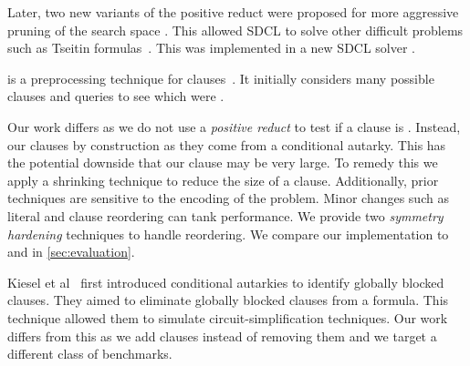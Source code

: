 Later, two new variants of the positive reduct were proposed for more aggressive pruning of the search space \cite{sadical}. This allowed SDCL to solve other difficult problems such as Tseitin formulas~\cite{hardexamplesresolution}. This was implemented in a new SDCL solver \sadical.


\prelearn is a preprocessing technique for \pr clauses~\cite{prelearn}. It initially considers many possible clauses and queries \sadical to see which were \pr.

Our work differs as we do not use a \emph{positive reduct} to test if a clause
is \pr. Instead, our clauses \pr by construction as they come from a conditional
autarky. This has the potential downside that our clause may be very large. To
remedy this we apply a shrinking technique to reduce the size of a clause.
Additionally, prior techniques are sensitive to the encoding of the problem.
Minor changes such as literal and clause reordering can tank performance. We
provide two \emph{symmetry hardening} techniques to handle reordering. We
compare our implementation \tool to \sadical and \prelearn in
\autoref{sec:evaluation}.

Kiesel et al~\cite{conditionalautarkies} first introduced conditional autarkies to identify globally blocked clauses. They aimed to eliminate globally blocked clauses from a formula. This technique allowed them to simulate circuit-simplification techniques. Our work differs from this as we add clauses instead of removing them and we target a different class of benchmarks.

